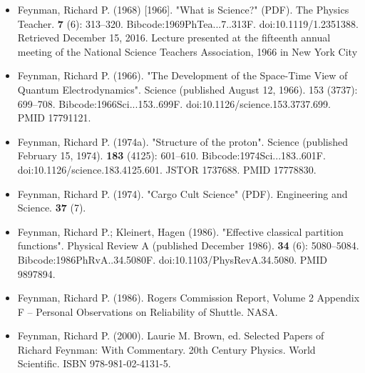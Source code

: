 \begin{itemize}
\item Feynman, Richard P. (1968) [1966]. "What is Science?" (PDF). The Physics Teacher. \textbf{7} (6): 313–320. Bibcode:1969PhTea...7..313F. doi:10.1119/1.2351388. Retrieved December 15, 2016. Lecture presented at the fifteenth annual meeting of the National Science Teachers Association, 1966 in New York City
\item Feynman, Richard P. (1966). "The Development of the Space-Time View of Quantum Electrodynamics". Science (published August 12, 1966). 153 (3737): 699–708. Bibcode:1966Sci...153..699F. doi:10.1126/science.153.3737.699. PMID 17791121.
\item Feynman, Richard P. (1974a). "Structure of the proton". Science (published February 15, 1974). \textbf{183} (4125): 601–610. Bibcode:1974Sci...183..601F. doi:10.1126/science.183.4125.601. JSTOR 1737688. PMID 17778830.
\item Feynman, Richard P. (1974). "Cargo Cult Science" (PDF). Engineering and Science. \textbf{37} (7).
\item Feynman, Richard P.; Kleinert, Hagen (1986). "Effective classical partition functions". Physical Review A (published December 1986). \textbf{34} (6): 5080–5084. Bibcode:1986PhRvA..34.5080F. doi:10.1103/PhysRevA.34.5080. PMID 9897894.
\item Feynman, Richard P. (1986). Rogers Commission Report, Volume 2 Appendix F – Personal Observations on Reliability of Shuttle. NASA.
\item Feynman, Richard P. (2000). Laurie M. Brown, ed. Selected Papers of Richard Feynman: With Commentary. 20th Century Physics. World Scientific. ISBN 978-981-02-4131-5.
\end{itemize}

